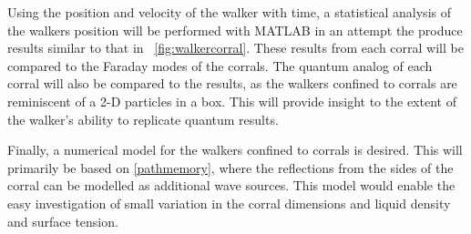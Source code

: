 \documentclass[11pt]{article}
\newcommand{\figref}[2][\figurename~]{#1\ref{#2}}
\begin{document}
Using the position and velocity of the walker with time, a statistical analysis of the walkers position will be performed with MATLAB in an attempt the produce results similar to that in \figref{fig:walkercorral}.  These results from each corral will be compared to the Faraday modes of the corrals.  The quantum analog of each corral will also be compared to the results, as the walkers confined to corrals are reminiscent of a 2-D particles in a box.  This will provide insight to the extent of the walker's ability to replicate quantum results.

Finally, a numerical model for the walkers confined to corrals is desired.  This will primarily be based on \eqref{pathmemory}, where the reflections from the sides of the corral can be modelled as additional wave sources.  This model would enable the easy investigation of small variation in the corral dimensions and liquid density and surface tension.

%
%
%



\end{document}
